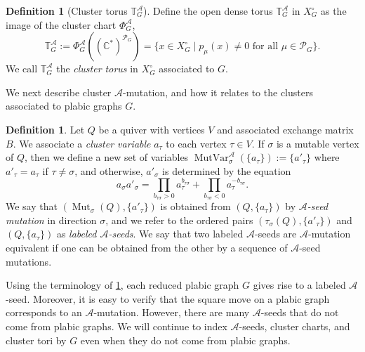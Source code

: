 \documentclass{amsart}
\theoremstyle{definition}
\newtheorem{definition}[thm]{Definition}
\numberwithin{equation}{section}
\newcommand{\Mut}{\operatorname{Mut}}
\newcommand{\MutVar}{\operatorname{MutVar}}
\newcommand{\C}{\mathbb{C}}
\newcommand{\A}{\mathcal{A}}
\newcommand{\opencheckX}{X_G^\circ}
\newcommand{\p}{{p}}
\begin{document}
\begin{definition}[Cluster torus $\mathbb T^\A_G$]  \label{rem2:convention}
Define the open dense torus $\mathbb T^\A_G $ in $\opencheckX$ as the image  of the cluster chart $\Phi^\A_G$,
\[
\mathbb T^\A_G
	:=\Phi_G^\A((\C^*)^{\mathcal{P}_G})=\{x\in X_G^{\circ} \mid \p_{\mu}(x)\ne 0 \text { for all $\mu\in \mathcal P_G$}\}.
\]
We call $\mathbb T^\A_G$ the {\it cluster torus} in $\opencheckX$ associated to $G$.
\end{definition}



We next describe cluster $\mathcal{A}$-mutation, and how it relates to the clusters associated to
plabic graphs $G$.


\begin{definition}\label{Aseed}
Let $Q$ be a quiver with vertices $V$ and associated exchange matrix $B$.
We associate a \emph{cluster variable} $a_{\tau}$ to each vertex $\tau \in V$.
If $\sigma$ is a mutable vertex of $Q$,
then we define a new set of
variables  $\MutVar_{\sigma}^{\mathcal{A}}(\{a_{\tau}\}) := \{a'_{\tau}\}$  where
$a'_{\tau} = a_{\tau}$ if $\tau \neq \sigma$, and otherwise, $a'_{\sigma}$ is determined
by the equation
\begin{equation}\label{e:AclusterMut}
a_{\sigma} a'_{\sigma} =
\prod_{b_{\tau \sigma} > 0} a_{\tau}^{b_{\tau \sigma}} +
\prod_{b_{\tau \sigma} < 0} a_{\tau}^{-b_{\tau \sigma}}.
\end{equation}
We say that
$(\Mut_{\sigma}(Q), \{a'_{\tau}\})$ is obtained from
 $(Q, \{a_{\tau}\})$ by \emph{$\mathcal{A}$-seed mutation}
 in direction $\sigma$, and we refer to the ordered pairs
$(\tau_{\sigma}(Q), \{a'_{\tau}\})$  and
 $(Q, \{a_{\tau}\})$ as \emph{labeled $\mathcal{A}$-seeds}.
	We say that two labeled $\mathcal{A}$-seeds are
	$\mathcal{A}$-mutation equivalent if one can be obtained
	from the other by a sequence of $\mathcal{A}$-seed mutations.
\end{definition}

Using the terminology of \cref{Aseed}, each reduced plabic graph $G$ gives rise to a
labeled $\mathcal{A}$-seed.  Moreover, it is easy to verify that the
square move on a plabic graph corresponds to 
an $\mathcal{A}$-mutation.
However, there are many $\mathcal{A}$-seeds that do not come from plabic
graphs.  We will continue to index $\mathcal{A}$-seeds, cluster charts,
and cluster tori by $G$ even when they do not come from plabic graphs.
\end{document}
